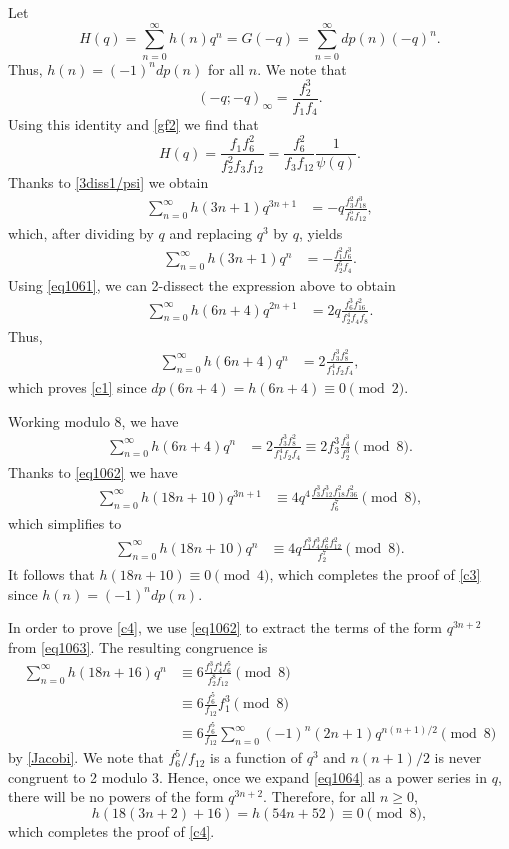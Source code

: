 \documentclass{amsart}
\begin{document}
Let 
$$H(q) = \sum_{n=0}^{\infty}h(n)q^n = G(-q) = \sum_{n=0}^{\infty}dp(n)(-q)^n.$$
Thus, $h(n) = (-1)^ndp(n)$ for all $n$. We note that
$$(-q;-q)_\infty = \frac{f_2^3}{f_1f_4}.$$
Using this identity and \eqref{gf2} we find that
\begin{equation*}
H(q) = \frac{f_1f_6^2}{f_2^2f_3f_{12}} = \frac{f_6^2}{f_3f_{12}} \frac{1}{\psi(q)}.
\end{equation*}
Thanks to \eqref{3diss1/psi} we obtain
\begin{align*}
\sum_{n=0}^{\infty}h(3n+1)q^{3n+1} & = -q \frac{f_3^2f_{18}^3}{f_6^5f_{12}},
\end{align*}
which, after dividing by $q$ and replacing $q^3$ by $q$, yields
\begin{align*}
\sum_{n=0}^{\infty}h(3n+1)q^{n} & = - \frac{f_1^2f_{6}^3}{f_2^5f_{4}}.
\end{align*}   
Using \eqref{eq1061}, we can 2-dissect the expression above to obtain
\begin{align*}
\sum_{n=0}^{\infty}h(6n+4)q^{2n+1} & = 2q \frac{f_6^3f_{16}^2}{f_2^4f_{4}f_8}.
\end{align*}
Thus,
\begin{align*}
\sum_{n=0}^{\infty}h(6n+4)q^{n} & = 2 \frac{f_3^3f_{8}^2}{f_1^4f_{2}f_4},
\end{align*}
which proves \eqref{c1} since $dp(6n+4) = h(6n+4) \equiv 0 \pmod{2}$.

Working modulo 8, we have
\begin{align}
\sum_{n=0}^{\infty}h(6n+4)q^{n} & = 2 \frac{f_3^3f_{8}^2}{f_1^4f_{2}f_4} \equiv 2 f_3^3\frac{f_4^3}{f_2^3} \pmod{8}.
\label{eq1063}
\end{align}
Thanks to \eqref{eq1062} we have
\begin{align*}
\sum_{n=0}^{\infty}h(18n+10)q^{3n+1} & \equiv 4q^4 \frac{f_3^3f_{12}^3f_{18}^2f_{36}^2}{f_6^7} \pmod{8},
\end{align*}
which simplifies to
\begin{align*}
\sum_{n=0}^{\infty}h(18n+10)q^{n} & \equiv 4q \frac{f_1^3f_{4}^3f_{6}^2f_{12}^2}{f_2^7} \pmod{8}.
\end{align*}
It follows that $h(18n+10) \equiv 0 \pmod{4}$, which completes the proof of \eqref{c3} since $h(n) = (-1)^n dp(n)$.

In order to prove \eqref{c4}, we use \eqref{eq1062} to extract the terms of the form $q^{3n+2}$ from \eqref{eq1063}. The resulting congruence is
\begin{align}
\sum_{n=0}^{\infty}h(18n+16)q^{n} & \equiv 6\frac{f_1^3f_{4}^4f_{6}^5}{f_2^8f_{12}}  \pmod{8}\nonumber \\
& \equiv 6\frac{f_6^5}{f_{12}} f_1^3 \pmod{8} \nonumber \\
& \equiv 6\frac{f_6^5}{f_{12}} \sum_{n=0}^{\infty} (-1)^n (2n+1) q^{n(n+1)/2} \pmod{8} \label{eq1064}
\end{align}
by \eqref{Jacobi}. We note that $f_6^5/f_{12}$ is a function of $q^3$ and $n(n+1)/2$ is never congruent to 2 modulo 3. Hence, once we expand \eqref{eq1064} as a power series in $q$, there will be no powers of the form $q^{3n+2}$. Therefore, for all $n \geq 0$, 
$$h(18(3n+2)+16) = h(54n+52) \equiv 0 \pmod{8},$$
which completes the proof of \eqref{c4}.
\end{document}
